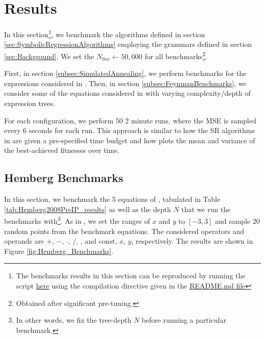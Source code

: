 \documentclass[runningheads]{llncs}
\newcommand\specialcaret{%
  \stackengine{0pt}{\ \,}{\scalebox{1.1}[2]{\raisebox{-0.9ex}{\string^}}}{O}{c}{F}{T}{L}}
\begin{document}
\section{Results}\label{sec:Results}
In this section\footnote{The benchmarks results in this section can be reproduced by running the script \href{https://github.com/edfink234/Alpha-Zero-Symbolic-Regression/blob/0b5b6d0b56c2d108dda023a337edeb1084436da7/PrefixPostfixSR.cpp}{here} using the compilation directive given in the \href{https://github.com/edfink234/Alpha-Zero-Symbolic-Regression/blob/0b5b6d0b56c2d108dda023a337edeb1084436da7/README.md}{README.md file}}, we benchmark the algorithms defined in section \ref{sec:SymbolicRegressionAlgorithms} employing the grammars defined in section \ref{sec:Background}. We set the $N_{\mathrm{iter}} \gets 50,000$ for all benchmarks\footnote{Obtained after significant pre-tuning.}.
\par First, in section \ref{subsec:SimulatedAnnealing}, we perform benchmarks for the expressions considered in \cite{hemberg2008pre}. Then, in section \ref{subsec:FeynmanBenchmarks}, we consider some of the equations considered in \cite{udrescu2020ai} with varying complexity/depth of expression trees.
\par For each configuration,
we perform 50 2 minute runs, where the MSE is sampled every 6 seconds for each run.  
This approach is similar to how the SR algorithms in \cite{defranca2023interpretable} are given a pre-specified time budget and how \cite{manti2023discovering} plots the mean and variance of the best-achieved fitnesses over time. 

\subsection{Hemberg Benchmarks} \label{subsec:HembergBenchmarks}
In this section, we benchmark the 5 equations of \cite{hemberg2008pre}, tabulated in Table \ref{tab:Hemberg2008PreIP_results} as well as the depth $N$ that we run the benchmarks with\footnote{In other words, we fix the tree-depth $N$ before running a particular benchmark.}. As in \cite{hemberg2008pre}, we set the ranges of $x$ and $y$ to $[-3,3]$ and sample 20 random points from the benchmark equations.  The considered operators and operands are $+$, $-$, $\cdot$, $/$, \specialcaret , and $\mathrm{const}$, $x$, $y$, respectively. The results are shown in Figure \ref{fig:Hemberg_Benchmarks}.
\end{document}
